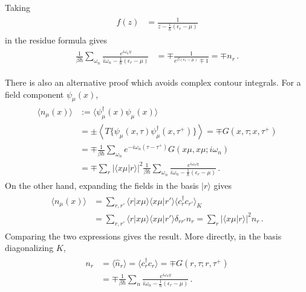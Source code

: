 \documentclass[../QFT_main.tex]{subfiles}
\begin{document}
\begin{mytheorem}
Taking
{\small\begin{align}\begin{aligned}
    f(z)
    &=
    \tfrac{1}{
        z-\tfrac{1}{\hbar}(\epsilon_r-\mu)
    }
\end{aligned}\end{align}}
in the residue formula gives
{\small\begin{align}\begin{aligned}
    \tfrac{1}{\beta\hbar}
    \sum_{\omega_n}
    \tfrac{e^{i\omega_n\eta}}{
        i\omega_n-\tfrac{1}{\hbar}(\epsilon_r-\mu)
    }
    &=
    \mp\tfrac{1}{
        e^{\beta(\epsilon_r-\mu)}\mp1
    }
    =\mp n_r\,.
\end{aligned}\end{align}}

There is also an alternative proof which avoids complex contour integrals.
For a field component $\psi_\mu(x)$,
{\small\begin{align}\begin{aligned}
    \langle n_\mu(x)\rangle
    &:=
    \langle\psi_\mu^\dagger(x)\psi_\mu(x)\rangle
    \\
    &=
    \pm\left\langle
        T\{\psi_\mu(x,\tau)\psi_\mu^\dagger(x,\tau^+)\}
    \right\rangle
    =
    \mp G(x,\tau;x,\tau^+)
    \\
    &=
    \mp\tfrac{1}{\beta\hbar}
    \sum_{\omega_n}
    e^{-i\omega_n(\tau-\tau^+)}
    G(x\mu,x\mu;i\omega_n)
    \\
    &=
    \mp\sum_r|\langle x\mu|r\rangle|^2
    \tfrac{1}{\beta\hbar}
    \sum_{\omega_n}
    \tfrac{e^{i\omega_n\eta}}{
        i\omega_n-\tfrac{1}{\hbar}(\epsilon_r-\mu)
    }\,.
\end{aligned}\end{align}}
On the other hand, expanding the fields in the basis $|r\rangle$ gives
{\small\begin{align}\begin{aligned}
    \langle n_\mu(x)\rangle
    &=
    \sum_{r,r'}
    \langle r|x\mu\rangle
    \langle x\mu|r'\rangle
    \langle c_r^\dagger c_{r'}\rangle_K
    \\
    &=
    \sum_{r,r'}
    \langle r|x\mu\rangle
    \langle x\mu|r'\rangle
    \delta_{rr'}n_r
    =
    \sum_r|\langle x\mu|r\rangle|^2n_r\,.
\end{aligned}\end{align}}
Comparing the two expressions gives the result.
More directly, in the basis diagonalizing $K$,
{\small\begin{align}\begin{aligned}
    n_r
    &=
    \langle\widehat n_r\rangle
    =
    \langle c_r^\dagger c_r\rangle
    =
    \mp G(r,\tau;r,\tau^+)
    \\
    &=
    \mp\tfrac{1}{\beta\hbar}
    \sum_n
    \tfrac{e^{i\omega_n\eta}}{
        i\omega_n-\tfrac{1}{\hbar}(\epsilon_r-\mu)
    }\,.
\end{aligned}\end{align}}
\end{mytheorem}
\end{document}
